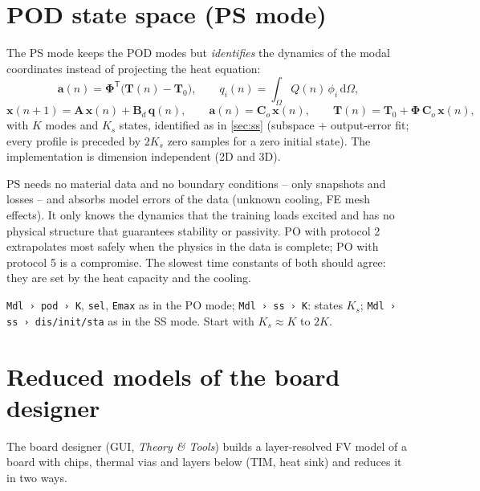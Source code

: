 \documentclass[11pt,a4paper]{article}
\newcommand{\T}{^{\mathsf T}}
\newcommand{\mat}[1]{\bm{#1}}
\newcommand{\cfg}[1]{\texttt{#1}}
\begin{document}
\section{POD state space (PS mode)}\label{sec:ps}
The PS mode keeps the POD modes but \emph{identifies} the dynamics of the modal coordinates instead of projecting the
heat equation:
\begin{equation}
  \bm a(n) = \bm\Phi\T\bigl(\bm T(n)-\bm T_0\bigr),\qquad q_i(n)=\int_\Omega Q(n)\,\phi_i\,\mathrm d\Omega,
\end{equation}
\begin{equation}
  \bm x(n+1) = \mat A\,\bm x(n) + \mat B_d\,\bm q(n),\qquad \bm a(n) = \mat C_o\,\bm x(n),\qquad
  \bm T(n) = \bm T_0 + \bm\Phi\,\mat C_o\,\bm x(n),
\end{equation}
with $K$ modes and $K_s$ states, identified as in \cref{sec:ss} (subspace + output-error fit; every profile is preceded
by $2K_s$ zero samples for a zero initial state). The implementation is dimension independent (2D and 3D).

\begin{keybox}[PO or PS?]
PS needs no material data and no boundary conditions -- only snapshots and losses -- and absorbs model errors of the
data (unknown cooling, FE mesh effects). It only knows the dynamics that the training loads excited and has no
physical structure that guarantees stability or passivity. PO with protocol 2 extrapolates most safely when the
physics in the data is complete; PO with protocol 5 is a compromise. The slowest time constants of both should agree:
they are set by the heat capacity and the cooling.
\end{keybox}

\begin{cfgbox}
\cfg{Mdl › pod › K}, \cfg{sel}, \cfg{Emax} as in the PO mode; \cfg{Mdl › ss › K}: states $K_s$;
\cfg{Mdl › ss › dis/init/sta} as in the SS mode. Start with $K_s\approx K$ to $2K$.
\end{cfgbox}

\section{Reduced models of the board designer}\label{sec:board}
The board designer (GUI, \emph{Theory \& Tools}) builds a layer-resolved FV model of a board with chips, thermal vias
and layers below (TIM, heat sink) and reduces it in two ways.
\end{document}

